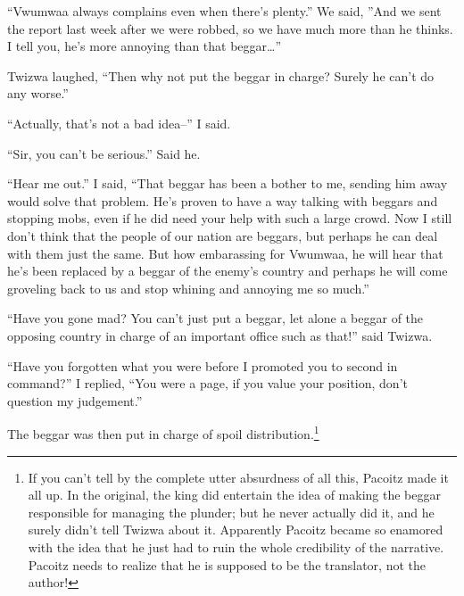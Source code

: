 ``Vwumwaa always complains even when there's plenty.'' We said, ''And we sent the report last week after we were robbed, so we have much more than he thinks. I tell you, he's more annoying than that beggar\ldots''

Twizwa laughed, ``Then why not put the beggar in charge? Surely he can't do any worse.''

``Actually, that's not a bad idea--'' I said.

``Sir, you can't be serious.'' Said he.

``Hear me out.'' I said, ``That beggar has been a bother to me, sending him away would solve that problem. He's proven to have a way talking with beggars and stopping mobs, even if he did need your help with such a large crowd. Now I still don't think that the people of our nation are beggars, but perhaps he can deal with them just the same. But how embarassing for Vwumwaa, he will hear that he's been replaced by a beggar of the enemy's country and perhaps he will come groveling back to us and stop whining and annoying me so much.''

``Have you gone mad? You can't just put a beggar, let alone a beggar of the opposing country in charge of an important office such as that!'' said Twizwa.

``Have you forgotten what you were before I promoted you to second in command?'' I replied, ``You were a page, if you value your position, don't question my judgement.''

The beggar was then put in charge of spoil distribution.\footnote{If you can't tell by the complete utter absurdness of all this, Pacoitz made it all up. In the original, the king did entertain the idea of making the beggar responsible for managing the plunder; but he never actually did it, and he surely didn't tell Twizwa about it. Apparently Pacoitz became so enamored with the idea that he just had to ruin the whole credibility of the narrative.
Pacoitz needs to realize that he is supposed to be the translator, not the author!}
